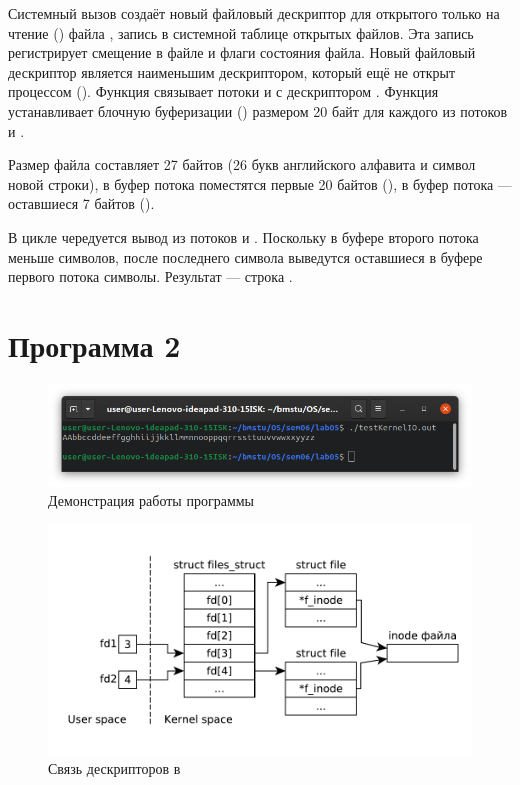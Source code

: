 \documentclass[a4paper,oneside,12pt]{extreport}
\begin{document}
Системный вызов  создаёт новый файловый дескриптор для открытого только на чтение () файла , запись в системной таблице открытых файлов.
Эта запись регистрирует смещение в файле и флаги состояния файла.
Новый файловый дескриптор является наименьшим дескриптором, который ещё не открыт процессом ().
Функция  связывает потоки  и  с дескриптором .
Функция  устанавливает блочную буферизации () размером 20 байт для каждого из потоков  и .

Размер файла  составляет 27 байтов (26 букв английского алфавита и символ новой строки), в буфер потока  поместятся первые 20 байтов (), в буфер потока  — оставшиеся 7 байтов ().

В цикле чередуется вывод из потоков  и .
Поскольку в буфере второго потока меньше символов, после последнего символа  выведутся оставшиеся в буфере первого потока символы.
Результат — строка .

\section*{Программа 2}



\begin{figure}[H]
	\centering
	\includegraphics[width=\linewidth]{inc/img/testKernelIO-runtime}
	\caption{Демонстрация работы программы }
	\label{img:testKernelIO-runtime}
\end{figure}

\begin{figure}[H]
	\centering
	\includegraphics[scale=0.65]{inc/img/testKernelIO}
	\caption{Связь дескрипторов в }
	\label{img:testKernelIO}
\end{figure}
\end{document}
